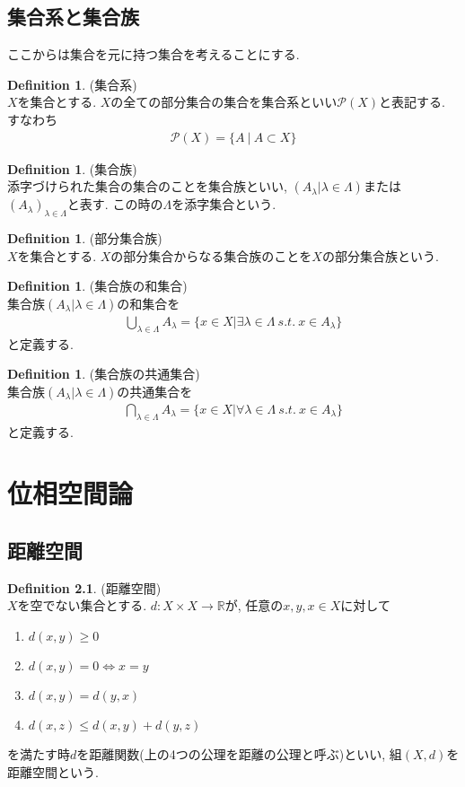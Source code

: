 \documentclass[11pt, a4paper, dvipdfmx]{jsbook}
\theoremstyle{definition}
\newtheorem{Definition+}[Axiom+]{Definition}
\newcommand{\R}{\mathbb{R}}
\begin{document}
\section{集合系と集合族}
ここからは集合を元に持つ集合を考えることにする.
\begin{Definition+}(集合系)\\
  $X$を集合とする. $X$の全ての部分集合の集合を集合系といい$\mathcal{P}(X)$と表記する. すなわち
  \begin{align*}
    \mathcal{P}(X) = \{A~|~ A\subset X\}
  \end{align*}
\end{Definition+}  
\begin{Definition+}(集合族)\\
  添字づけられた集合の集合のことを集合族といい, $(A_{\lambda} | \lambda \in \Lambda)$または$(A_{\lambda})_{\lambda\in\Lambda}$と表す. この時の$\Lambda$を添字集合という.
\end{Definition+}
\begin{Definition+}(部分集合族)\\
  $X$を集合とする. $X$の部分集合からなる集合族のことを$X$の部分集合族という.
\end{Definition+}
\begin{Definition+}(集合族の和集合)\\
  集合族$(A_{\lambda} | \lambda \in \Lambda)$の和集合を
  \begin{align*}
    \bigcup_{\lambda\in\Lambda}A_{\lambda} = \{x\in X| \exists \lambda\in\Lambda ~s.t. ~x\in A_{\lambda}\}
  \end{align*}
  と定義する.
\end{Definition+}
\begin{Definition+}(集合族の共通集合)\\
  集合族$(A_{\lambda} | \lambda \in \Lambda)$の共通集合を
  \begin{align*}
    \bigcap_{\lambda\in\Lambda}A_{\lambda} = \{x\in X| \forall \lambda\in\Lambda ~s.t. ~x\in A_{\lambda}\}
  \end{align*}
  と定義する.
\end{Definition+}

\chapter{位相空間論}
\section{距離空間}
\begin{Definition+}(距離空間)\\
  $X$を空でない集合とする. $d:X\times X\to\R$が, 任意の$x, y, x\in X$に対して
  \begin{enumerate}
    \item $d(x, y) \geq 0$
    \item $d(x, y) = 0\Longleftrightarrow x = y$
    \item $d(x, y) = d(y, x)$
    \item $d(x, z) \leq d(x, y) + d(y, z)$
  \end{enumerate}
  を満たす時$d$を距離関数(上の4つの公理を距離の公理と呼ぶ)といい, 組$(X, d)$を距離空間という.
\end{Definition+}
\end{document}
